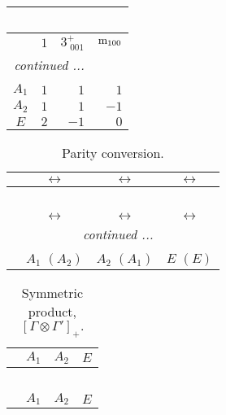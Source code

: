 \documentclass[fleqn,10pt,landscape]{article}
\begin{document}
\begin{itemize}
\begin{center}
\begin{longtable}{c|rrr}
\multicolumn{3}{l}{\tablename\ \thetable{}} \\
 \hline \hline
 & $ 1 $ & $ 3^{+}_{\,\,001} $ & $ {\rm m}_{100} $ \\ \hline \endhead

 \hline \hline
\multicolumn{3}{r}{\footnotesize\it continued ...} \\ \endfoot

 \hline \hline
\multicolumn{3}{r}{} \\ \endlastfoot

$ A_{1} $ & $ 1 $ & $ 1 $ & $ 1 $ \\
$ A_{2} $ & $ 1 $ & $ 1 $ & $ -1 $ \\
$ E $ & $ 2 $ & $ -1 $ & $ 0 $ \\
\end{longtable}
\end{center}
\begin{center}
\renewcommand{\arraystretch}{1.0}
\begin{longtable}{cccc}
\caption{Parity conversion.}
 \\
 \hline \hline
 & $\leftrightarrow$ & $\leftrightarrow$ & $\leftrightarrow$ \\ \hline \endfirsthead

\multicolumn{3}{l}{\tablename\ \thetable{}} \\
 \hline \hline
 & $\leftrightarrow$ & $\leftrightarrow$ & $\leftrightarrow$ \\ \hline \endhead

 \hline \hline
\multicolumn{3}{r}{\footnotesize\it continued ...} \\ \endfoot

 \hline \hline
\multicolumn{3}{r}{} \\ \endlastfoot

 & $ A_{1}\,\,(A_{2}) $ & $ A_{2}\,\,(A_{1}) $ & $ E\,\,(E) $ \\
\end{longtable}
\end{center}
\begin{center}
\renewcommand{\arraystretch}{1.0}
\begin{longtable}{c|ccc}
\caption{Symmetric product, $[\Gamma\otimes\Gamma']_+.$}
 \\
 \hline \hline
 & $ A_{1} $ & $ A_{2} $ & $ E $ \\ \hline \endfirsthead

\multicolumn{3}{l}{\tablename\ \thetable{}} \\
 \hline \hline
 & $ A_{1} $ & $ A_{2} $ & $ E $ \\ \hline \endhead


\end{longtable}
\end{center}
\end{itemize}
\end{document}
